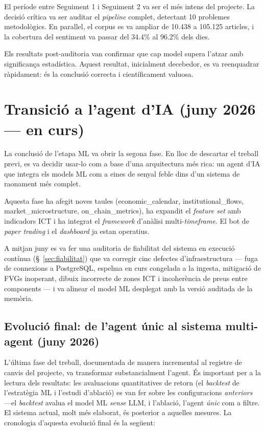 \documentclass[12pt, a4paper]{report}
\begin{document}
El període entre Seguiment 1 i Seguiment 2 va ser el més intens del projecte. La decisió crítica va ser auditar el \textit{pipeline} complet, detectant 10 problemes metodològics. En paral\textperiodcentered{}lel, el corpus es va ampliar de 10.438 a 105.125 articles, i la cobertura del sentiment va passar del 34.4\% al 96.2\% dels dies.

Els resultats post-auditoria van confirmar que cap model supera l'atzar amb significança estadística. Aquest resultat, inicialment decebedor, es va reenquadrar ràpidament: és la conclusió correcta i científicament valuosa.

\section{Transició a l'agent d'IA (juny 2026 --- en curs)}

La conclusió de l'etapa ML va obrir la segona fase. En lloc de descartar el treball previ, es va decidir usar-lo com a base d'una arquitectura més rica: un agent d'IA que integra els models ML com a eines de senyal feble dins d'un sistema de raonament més complet.

Aquesta fase ha afegit noves taules (economic\_calendar, institutional\_flows, market\_microstructure, on\_chain\_metrics), ha expandit el \textit{feature set} amb indicadors ICT i ha integrat el \textit{framework} d'anàlisi multi-\textit{timeframe}. El bot de \textit{paper trading} i el \textit{dashboard} ja estan operatius.

A mitjan juny es va fer una auditoria de fiabilitat del sistema en execució contínua (\S~\ref{sec:fiabilitat}) que va corregir cinc defectes d'infraestructura --- fuga de connexions a PostgreSQL, espelma en curs congelada a la ingesta, mitigació de FVGs inoperant, dibuix incorrecte de zones ICT i incoherència de preus entre components --- i va alinear el model ML desplegat amb la versió auditada de la memòria.

\subsection{Evolució final: de l'agent únic al sistema multi-agent (juny 2026)}

L'última fase del treball, documentada de manera incremental al registre de canvis del projecte, va transformar substancialment l'agent. És important per a la lectura dels resultats: les avaluacions quantitatives de retorn (el \textit{backtest} de l'estratègia ML i l'estudi d'ablació) es van fer sobre les configuracions \emph{anteriors} ---el \textit{backtest} avalua el model ML \emph{sense} LLM, i l'ablació, l'agent \emph{únic} com a filtre. El sistema actual, molt més elaborat, és posterior a aquelles mesures. La cronologia d'aquesta evolució final és la següent:
\end{document}
